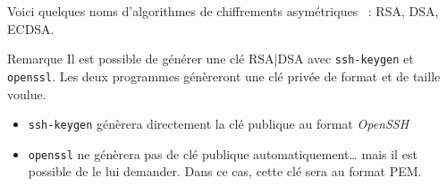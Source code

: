 \documentclass[a4paper,11pt]{article}
\begin{document}
Voici quelques noms d'algorithmes de chiffrements asymétriques
~: RSA, DSA, ECDSA. 
	
\begin{coltbox}{Remarque}	
	Il est possible de générer une clé RSA|DSA avec \texttt{ssh-keygen} et
	\texttt{openssl}. Les deux programmes génèreront une clé privée de format et
	de taille voulue.

	\begin{itemize}
		\item \texttt{ssh-keygen} génèrera directement la clé publique au
			format \textit{OpenSSH}
		\item \texttt{openssl} ne génèrera pas de clé publique
			automatiquement… mais il est possible de le lui demander. Dans ce
			cas, cette clé sera au format PEM.
	\end{itemize}
\end{coltbox}
\vspace{1cm}
\end{document}
